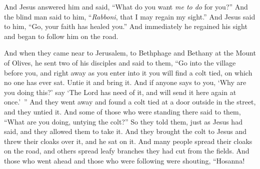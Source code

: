 \begin{biblechapter}
\verse And Jesus answered him and said, “What do you want \textit{me to do} for you?” And the blind man said to him, “\textit{Rabboni}, that I may regain my sight.”
\verse And Jesus said to him, “Go, your faith has healed you.” And immediately he regained his sight and began to follow him on the road.
\end{biblechapter}

\begin{biblechapter} %
 And when they came near to Jerusalem, to Bethphage and Bethany at the Mount of Olives, he sent two of his disciples
\verse and said to them, “Go into the village before you, and right away as you enter into it you will find a colt tied, on which no one has ever sat. Untie it and bring it.
\verse And if anyone says to you, ‘Why are you doing this?’ say ‘The Lord has need of it, and will send it here again at once.’ ”
\verse And they went away and found a colt tied at a door outside in the street, and they untied it.
\verse And some of those who were standing there said to them, “What are you doing, untying the colt?”
\verse So they told them, just as Jesus had said, and they allowed them to take it.
\verse And they brought the colt to Jesus and threw their cloaks over it, and he sat on it.
\verse And many people spread their cloaks on the road, and others spread leafy branches they had cut from the fields.
\verse And those who went ahead and those who were following were shouting,
\verse “Hosanna! 

\end{biblechapter}
